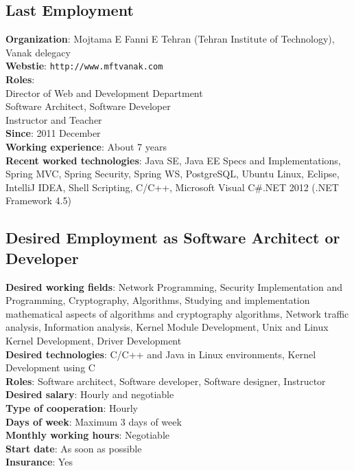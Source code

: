 \documentclass[12pt,a4paper]{article}
\begin{document}
	\subsection{Last Employment} 
		\textbf{Organization}: Mojtama E Fanni E Tehran (Tehran Institute of Technology), Vanak delegacy \\
		\textbf{Webstie}: \texttt{http://www.mftvanak.com} \\
		\textbf{Roles}: \\ \indent Director of Web and Development Department \\ \indent Software Architect, Software Developer \\ \indent Instructor and Teacher \\
		\textbf{Since}: 2011 December \\
		\textbf{Working experience}: About 7 years \\
		\textbf{Recent worked technologies}: Java SE, Java EE Specs and Implementations, Spring MVC, Spring Security, Spring WS, PostgreSQL, Ubuntu Linux, Eclipse, IntelliJ IDEA, Shell Scripting, C/C++, Microsoft Visual C\#.NET 2012 (.NET Framework 4.5)
	
	\subsection{Desired Employment as Software Architect or Developer}
	   \textbf{Desired working fields}: Network Programming, Security Implementation and Programming, Cryptography, Algorithms, Studying and implementation mathematical aspects of algorithms and cryptography algorithms, Network traffic analysis, Information analysis, Kernel Module Development, Unix and Linux Kernel Development, Driver Development \\
	   \textbf{Desired technologies}: C/C++ and Java in Linux environments, Kernel Development using C \\
	   \textbf{Roles}: Software architect, Software developer, Software designer, Instructor \\
	   \textbf{Desired salary}: Hourly and negotiable \\
	   \textbf{Type of cooperation}: Hourly \\
	   \textbf{Days of week}: Maximum 3 days of week \\
	   \textbf{Monthly working hours}: Negotiable \\
	   \textbf{Start date}: As soon as possible \\
	   \textbf{Insurance}: Yes
	   
\end{document}
